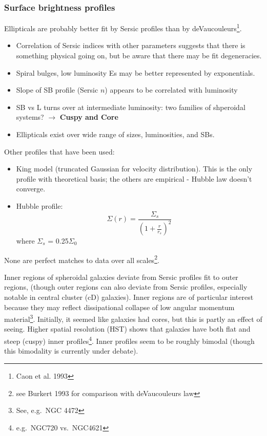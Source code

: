 \documentclass{article}
\newcommand{\mynotes}[1]{\textcolor{cadmiumgreen}{#1}}
\begin{document}
\subsubsection{Surface brightness profiles}
Ellipticals are probably better fit by Sersic profiles than by
deVaucouleurs\footnote{Caon et al. 1993}.
\begin{itemize}
    \item Correlation of Sersic indices with other parameters
        suggests that there is something physical going on, but be aware that
        there may be fit degeneracies.
    \item Spiral bulges, low luminosity Es may be better
        represented by exponentials.
    \item Slope of SB profile (Sersic $n$) appears to be correlated with
        luminosity
    \item SB vs L turns over at intermediate luminosity:
        two families of shperoidal systems? \mynotes{
            $\rightarrow$ \textbf{Cuspy and Core}}
    \item Ellipticals exist over wide range of sizes, luminosities, and SBs.
\end{itemize}
Other profiles that have been used:
\begin{itemize}
    \item King model (truncated Gaussian for velocity distribution). This
        is the only profile with theoretical basis; the others are
        empirical - Hubble law doesn't converge.
    \item Hubble profile:
        \[
            \Sigma(r) = \frac{ \Sigma_{s} }
            {\left( 1 + \frac{r}{r_{s}} \right)^{2}}
            \]
        where $\Sigma_{s}$ = 0.25$\Sigma_{0}$
\end{itemize}
None are perfect matches to data over all scales\footnote{see Burkert 1993 for
comparison with deVaucouleurs law}.

Inner regions of spheroidal galaxies deviate from Sersic profiles fit to
outer regions, (though outer regions can also deviate from Sersic profiles,
especially notable in central cluster (cD) galaxies). Inner regions are of
particular interest because they may reflect dissipational collapse of low
angular momentum material\footnote{See, e.g.\ NGC 4472}. Initially, it
seemed like galaxies had cores, but this is partly an effect of seeing.
Higher spatial resolution (HST) shows that galaxies have both flat and
steep (cuspy) inner profiles\footnote{e.g.\ NGC720 vs.\ NGC4621}. Inner
profiles seem to be roughly bimodal (though this bimodality is currently
under debate).
\end{document}
